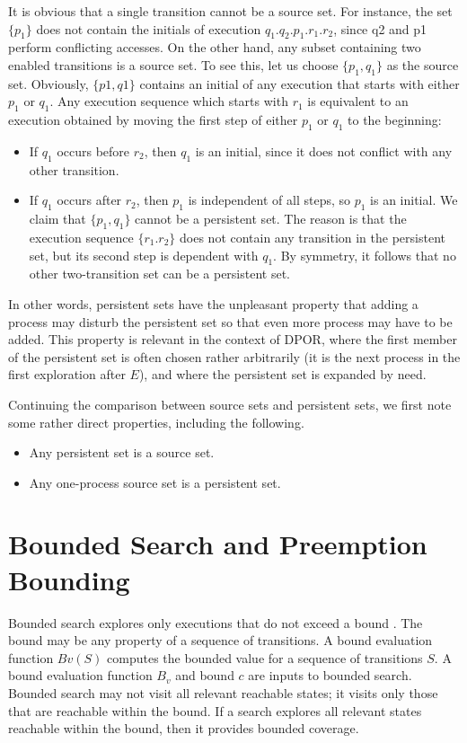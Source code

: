 It is obvious that a single transition cannot be a source set. For
instance, the set $\{ p_1 \}$ does not contain the initials of execution $q_1.q_2.p_1.r_1.r_2$,
since q2 and p1 perform conflicting accesses. On the other hand, any subset
containing two enabled transitions is a source set. To see this, let us choose
$\{p_1, q_1 \}$ as the source set. Obviously, $\{p1, q1 \}$ contains an initial of any execution
that starts with either $p_1$ or $q_1$. Any execution sequence which starts with $r_1$ is
equivalent to an execution obtained by moving the first step of either $p_1$ or $q_1$ to
the beginning:
\begin{itemize}
\item If $q_1$ occurs before $r_2$, then $q_1$ is an initial, since it does not conflict with
any other transition.
\item If $q_1$ occurs after $r_2$, then $p_1$ is independent of all steps, so $p_1$ is an initial.
We claim that $\{p_1, q_1 \}$ cannot be a persistent set. The reason is that the execution
sequence $\{r_1.r_2 \}$ does not contain any transition in the persistent set, but its second
step is dependent with $q_1$. By symmetry, it follows that no other two-transition
set can be a persistent set.
\end{itemize}

In other words, persistent sets have the unpleasant property that adding a process
may disturb the persistent set so that even more process may have to be added.
This property is relevant in the context of DPOR, where the first member of the
persistent set is often chosen rather arbitrarily (it is the next process in the first
exploration after $E$), and where the persistent set is expanded by need.

Continuing the comparison between source sets and persistent sets, we first
note some rather direct properties, including the following.

\begin{itemize}
\item Any persistent set is a source set.
\item Any one-process source set is a persistent set.
\end{itemize}


\section{Bounded Search and Preemption Bounding}

Bounded search explores only executions that do not exceed
a bound \cite{BPOR,Thomson}. The bound may be any property of a
sequence of transitions. A bound evaluation function $Bv(S)$
computes the bounded value for a sequence of transitions $S$.
A bound evaluation function $B_v$ and bound $c$ are inputs to
bounded search. Bounded search may not visit all relevant
reachable states; it visits only those that are reachable within
the bound. If a search explores all relevant states reachable
within the bound, then it provides bounded coverage.

